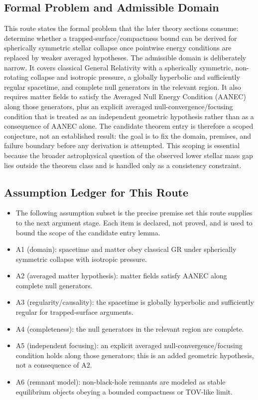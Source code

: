 \documentclass[conference]{IEEEtran}
\begin{document}
\subsection{Formal Problem and Admissible Domain}
This route states the formal problem that the later theory sections consume: determine whether a trapped-surface/compactness bound can be derived for spherically symmetric stellar collapse once pointwise energy conditions are replaced by weaker averaged hypotheses. The admissible domain is deliberately narrow. It covers classical General Relativity with a spherically symmetric, non-rotating collapse and isotropic pressure, a globally hyperbolic and sufficiently regular spacetime, and complete null generators in the relevant region. It also requires matter fields to satisfy the Averaged Null Energy Condition (AANEC) along those generators, plus an explicit averaged null-convergence/focusing condition that is treated as an independent geometric hypothesis rather than as a consequence of AANEC alone. The candidate theorem entry is therefore a scoped conjecture, not an established result: the goal is to fix the domain, premises, and failure boundary before any derivation is attempted. This scoping is essential because the broader astrophysical question of the observed lower stellar mass gap lies outside the theorem class and is handled only as a consistency constraint.

\subsection{Assumption Ledger for This Route}
\begin{itemize}
\item The following assumption subset is the precise premise set this route supplies to the next argument stage. Each item is declared, not proved, and is used to bound the scope of the candidate entry lemma.
\item A1 (domain): spacetime and matter obey classical GR under spherically symmetric collapse with isotropic pressure.
\item A2 (averaged matter hypothesis): matter fields satisfy AANEC along complete null generators.
\item A3 (regularity/causality): the spacetime is globally hyperbolic and sufficiently regular for trapped-surface arguments.
\item A4 (completeness): the null generators in the relevant region are complete.
\item A5 (independent focusing): an explicit averaged null-convergence/focusing condition holds along those generators; this is an added geometric hypothesis, not a consequence of A2.
\item A6 (remnant model): non-black-hole remnants are modeled as stable equilibrium objects obeying a bounded compactness or TOV-like limit.
\end{itemize}
\end{document}
